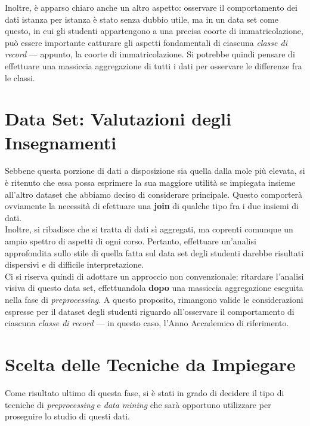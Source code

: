             Inoltre, è apparso chiaro anche un altro aspetto: osservare il comportamento dei dati istanza per istanza è stato senza dubbio utile, ma in un data set come questo, in cui gli studenti appartengono a una precisa coorte di immatricolazione, può essere importante catturare gli aspetti fondamentali di ciascuna \textit{classe di record} --- appunto, la coorte di immatricolazione. Si potrebbe quindi pensare di effettuare una massiccia aggregazione di tutti i dati per osservare le differenze fra le classi.

    \section{Data Set: Valutazioni degli Insegnamenti}

        Sebbene questa porzione di dati a disposizione sia quella dalla mole più elevata, si è ritenuto che essa possa esprimere la sua maggiore utilità se impiegata insieme all'altro dataset che abbiamo deciso di considerare principale. Questo comporterà ovviamente la necessità di efettuare una \textbf{join} di qualche tipo fra i due insiemi di dati.\\

        Inoltre, si ribadisce che si tratta di dati sì aggregati, ma coprenti comunque un ampio spettro di aspetti di ogni corso. Pertanto, effettuare un'analisi approfondita sullo stile di quella fatta sul data set degli studenti darebbe risultati dispersivi e di difficile interpretazione. \\

        Ci si riserva quindi di adottare un approccio non convenzionale: ritardare l'analisi visiva di questo data set, effettuandola \textbf{dopo} una massiccia aggregazione eseguita nella fase di \textit{preprocessing}. A questo proposito, rimangono valide le considerazioni espresse per il dataset degli studenti riguardo all'osservare il comportamento di ciascuna \textit{classe di record} --- in questo caso, l'Anno Accademico di riferimento.

    \section{Scelta delle Tecniche da Impiegare}

        Come risultato ultimo di questa fase, si è stati in grado di decidere il tipo di tecniche di \textit{preprocessing} e \textit{data mining} che sarà opportuno utilizzare per proseguire lo studio di questi dati. \\

